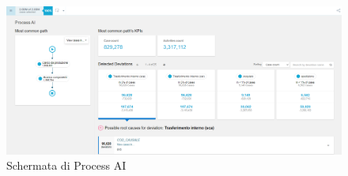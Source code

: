 \documentclass{article}
\begin{document}
\begin{figure}[H]
    \centering
    \includegraphics[width=\textwidth]{imgCelonis/DatiReali/ProcessAI.png}
    \caption{Schermata di Process AI}
    \label{fig:schermata-Process-AI}
\end{figure}
\end{document}
